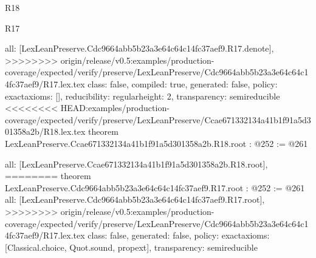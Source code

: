 \begin{lexlean}{R18}
\begin{lexlean}{R17}
\begin{coremodule}
{{{{{  all: [LexLeanPreserve.Cdc9664abb5b23a3e64c64c14fc37aef9.R17.denote],
>>>>>>>> origin/release/v0.5:examples/production-coverage/expected/verify/preserve/LexLeanPreserve/Cdc9664abb5b23a3e64c64c14fc37aef9/R17.lex.tex
  class: false,
  compiled: true,
  generated: false,
  policy: exact{axioms: []},
  reducibility: regular{height: 2},
  transparency: semireducible
}
<<<<<<<< HEAD:examples/production-coverage/expected/verify/preserve/LexLeanPreserve/Ccae671332134a41b1f91a5d301358a2b/R18.lex.tex
theorem LexLeanPreserve.Ccae671332134a41b1f91a5d301358a2b.R18.root : @252 := @261 {
  all: [LexLeanPreserve.Ccae671332134a41b1f91a5d301358a2b.R18.root],
========
theorem LexLeanPreserve.Cdc9664abb5b23a3e64c64c14fc37aef9.R17.root : @252 := @261 {
  all: [LexLeanPreserve.Cdc9664abb5b23a3e64c64c14fc37aef9.R17.root],
>>>>>>>> origin/release/v0.5:examples/production-coverage/expected/verify/preserve/LexLeanPreserve/Cdc9664abb5b23a3e64c64c14fc37aef9/R17.lex.tex
  class: false,
  generated: false,
  policy: exact{axioms: [Classical.choice, Quot.sound, propext]},
  transparency: semireducible
}

}}}}}
\end{coremodule}
\end{lexlean}
\end{lexlean}
